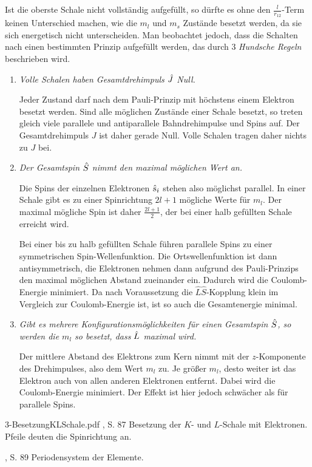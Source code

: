 Ist die oberste Schale nicht vollständig aufgefüllt, so dürfte es ohne den
$\frac{l}{r_{12}}$-Term keinen Unterschied machen, wie die $m_l$ und $m_s$
Zustände besetzt werden, da sie sich energetisch nicht unterscheiden. Man beobachtet jedoch, dass die Schalten
nach einen bestimmten Prinzip aufgefüllt werden, das durch 3 \emph{Hundsche
Regeln} beschrieben wird.
\begin{enumerate}[label=\arabic{*}.)]
  \item \textit{Volle Schalen haben Gesamtdrehimpuls $\hat{\boldmath{J}}$ Null.}

Jeder Zustand darf nach dem Pauli-Prinzip mit höchstens einem Elektron besetzt
werden. Sind alle möglichen Zustände einer Schale besetzt, so treten gleich
viele parallele und antiparallele Bahndrehimpulse und Spins auf. Der Gesamtdrehimpuls
$J$ ist daher gerade Null. Volle Schalen tragen daher nichts zu $J$ bei.
\item \textit{Der Gesamtspin $\hat{\boldmath{S}}$ nimmt den maximal möglichen Wert an.}

Die Spins der einzelnen Elektronen $\hat{\boldmath{s}}_i$ stehen also möglichst parallel.
In einer Schale gibt es zu einer Spinrichtung $2l+1$ mögliche Werte für $m_l$.
Der maximal mögliche Spin ist daher $\frac{2l+1}{2}$, der bei einer
halb gefüllten Schale erreicht wird.

Bei einer bis zu halb gefüllten Schale führen parallele Spins zu einer
symmetrischen Spin-Wellenfunktion. Die Ortswellenfunktion ist dann
antisymmetrisch, die Elektronen nehmen dann aufgrund des
Pauli-Prinzips den maximal möglichen Abstand zueinander ein. Dadurch wird die
Coulomb-Energie minimiert. Da nach Voraussetzung die
$\hat{L}\hat{S}$-Kopplung klein im Vergleich zur Coulomb-Energie ist, ist so
auch die Gesamtenergie minimal.
\item \textit{Gibt es mehrere Konfigurationsmöglichkeiten für
einen Gesamtspin $\hat{\boldmath{S}}$, so werden die $m_l$ so besetzt, dass $\hat{\boldmath{L}}$
maximal wird.}

Der mittlere Abstand des Elektrons zum Kern nimmt mit der $z$-Komponente des
Drehimpulses, also dem Wert $m_l$ zu. Je größer $m_l$, desto weiter ist das
Elektron auch von allen anderen Elektronen entfernt. Dabei wird die
Coulomb-Energie minimiert. Der Effekt ist hier jedoch schwächer als für
parallele Spins.
\end{enumerate}

\sfigure%
	{3-BesetzungKLSchale.pdf}
	{\HertelSchulz, S. 87}
	{Besetzung der $K$- und $L$-Schale mit Elektronen. Pfeile deuten die
	Spinrichtung an.}

	{\HertelSchulz, S. 89}
	{Periodensystem der Elemente.}
	